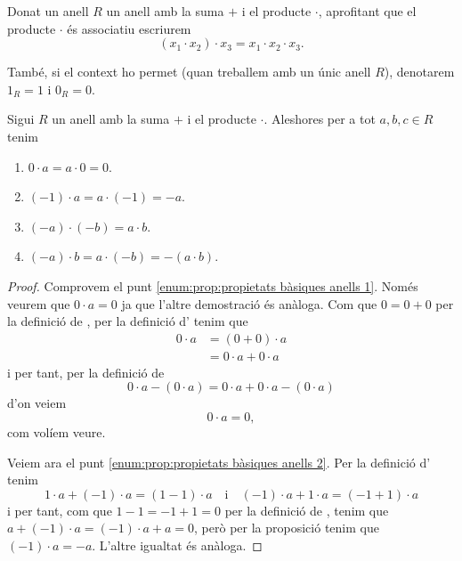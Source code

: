\documentclass[../Apunts.tex]{subfiles}
\begin{document}
	\begin{notation}
		Donat un anell \(R\) un anell amb la suma \(+\) i el producte \(\cdot\), aprofitant que el producte \(\cdot\) és associatiu escriurem
		\[(x_{1}\cdot x_{2})\cdot x_{3}=x_{1}\cdot x_{2}\cdot x_{3}.\]
		
		També, si el context ho permet (quan treballem amb un únic anell \(R\)), denotarem \(1_{R}=1\) i \(0_{R}=0\).
	\end{notation}
	\begin{proposition}
		\label{prop:propietats bàsiques anells}
		Sigui \(R\) un anell amb la suma \(+\) i el producte \(\cdot\). Aleshores per a tot \(a,b,c\in R\) tenim
		\begin{enumerate}
			\item\label{enum:prop:propietats bàsiques anells 1} \(0\cdot a=a\cdot0=0\).
			\item\label{enum:prop:propietats bàsiques anells 2} \((-1)\cdot a=a\cdot(-1)=-a\).
			\item\label{enum:prop:propietats bàsiques anells 3} \((-a)\cdot(-b)=a\cdot b\).
			\item\label{enum:prop:propietats bàsiques anells 4} \((-a)\cdot b=a\cdot(-b)=-(a\cdot b)\).
		\end{enumerate}
		\begin{proof}
			Comprovem el punt \eqref{enum:prop:propietats bàsiques anells 1}. Només veurem que \(0\cdot a=0\) ja que l'altre demostració és anàloga. Com que \(0=0+0\) per la definició de , per la definició d' tenim que
			\begin{align*}
			0\cdot a&=(0+0)\cdot a\\
			&=0\cdot a+0\cdot a
			\end{align*}
			i per tant, per la definició de 
			\[0\cdot a-(0\cdot a)=0\cdot a+0\cdot a-(0\cdot a)\]
			d'on veiem
			\[0\cdot a=0,\]
			com volíem veure.
			
			Veiem ara el punt \eqref{enum:prop:propietats bàsiques anells 2}. Per la definició d' tenim
			\[1\cdot a+(-1)\cdot a=(1-1)\cdot a\quad\text{i}\quad(-1)\cdot a+1\cdot a=(-1+1)\cdot a\]
			i per tant, com que \(1-1=-1+1=0\) per la definició de , tenim que \(a+(-1)\cdot a=(-1)\cdot a+a=0\), però per la proposició  tenim que \((-1)\cdot a=-a\). L'altre igualtat és anàloga.
			

\end{proof}
\end{proposition}
\end{document}
